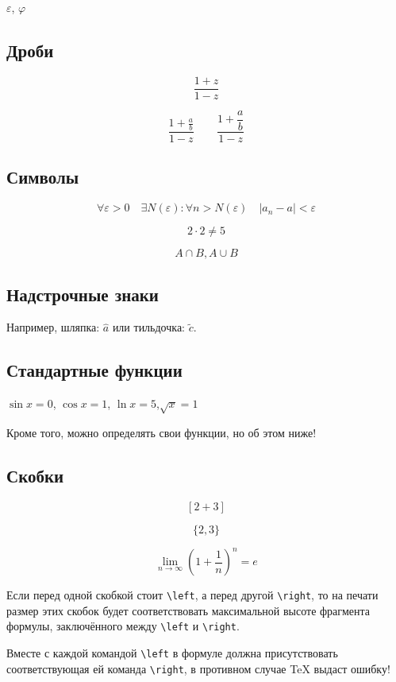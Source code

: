 \documentclass[12pt, a4paper]{article}
\begin{document}
$\varepsilon$, $\varphi$


\subsection{Дроби}

\[\frac{1 + z}{1 - z}\]

\[\frac{1 + \frac{a}{b}}{1 - z} \qquad \frac{1 + \dfrac{a}{b}}{1 - z}\]

\subsection{Символы}

\[ \forall \varepsilon > 0 \quad  \exists N(\varepsilon) : \forall n > N(\varepsilon) \quad |a_n - a| < \varepsilon \]

\[ 2 \cdot 2 \ne 5 \]

\[ A \cap B, A \cup B \]

\subsection{Надстрочные знаки}

Например, шляпка: $\hat{a}$ или тильдочка: $\tilde{c}$.

\subsection{Стандартные функции}

$\sin x = 0$, $\cos x = 1$, $\ln x = 5$,$\sqrt x = 1$

Кроме того, можно определять свои функции, но об этом ниже!




\subsection{Скобки}

\[  [2+3]  \]

\[ \{2,3\} \]

\[\lim_{n \to \infty} \left(1+\frac{1}{n}\right)^n = e \]

Если перед одной скобкой стоит \verb|\left|, а перед другой \verb|\right|, то на печати размер этих скобок будет соответствовать максимальной высоте фрагмента формулы, заключённого между  \verb|\left| и \verb|\right|.

Вместе с каждой командой \verb|\left| в формуле должна присутствовать соответствующая ей команда \verb|\right|, в противном случае \TeX{} выдаст ошибку! 
\end{document}

